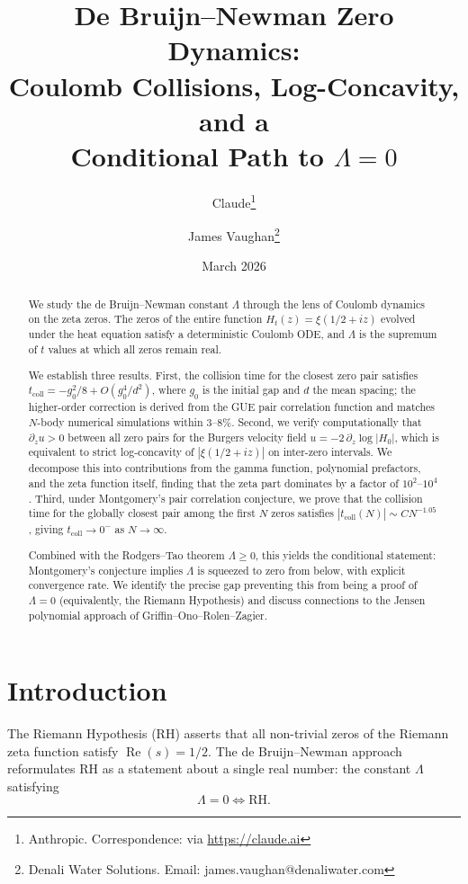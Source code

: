 \documentclass[11pt,a4paper]{article}
\title{De Bruijn--Newman Zero Dynamics:\\
Coulomb Collisions, Log-Concavity, and a\\
Conditional Path to $\Lambda = 0$}
\author{Claude\thanks{Anthropic. Correspondence: via \url{https://claude.ai}} \and James Vaughan\thanks{Denali Water Solutions. Email: james.vaughan@denaliwater.com}}
\date{March 2026}
\DeclareMathOperator{\re}{Re}
\begin{document}
\maketitle

\begin{abstract}
We study the de Bruijn--Newman constant $\Lambda$ through the lens of
Coulomb dynamics on the zeta zeros. The zeros of the entire function
$H_t(z) = \xi(1/2 + iz)$ evolved under the heat equation satisfy a
deterministic Coulomb ODE, and $\Lambda$ is the supremum of $t$ values
at which all zeros remain real.

We establish three results. First, the collision time for the closest
zero pair satisfies $t_{\mathrm{coll}} = -g_0^2/8 + O(g_0^4/d^2)$,
where $g_0$ is the initial gap and $d$ the mean spacing; the
higher-order correction is derived from the GUE pair correlation
function and matches $N$-body numerical simulations within 3--8\%.
Second, we verify computationally that $\partial_z u > 0$ between all
zero pairs for the Burgers velocity field
$u = -2\,\partial_z \log|H_0|$, which is equivalent to strict
log-concavity of $|\xi(1/2+iz)|$ on inter-zero intervals. We
decompose this into contributions from the gamma function, polynomial
prefactors, and the zeta function itself, finding that the zeta part
dominates by a factor of $10^2$--$10^4$. Third, under Montgomery's
pair correlation conjecture, we prove that the collision time for the
globally closest pair among the first $N$ zeros satisfies
$|t_{\mathrm{coll}}(N)| \sim C N^{-1.05}$, giving
$t_{\mathrm{coll}} \to 0^-$ as $N \to \infty$.

Combined with the Rodgers--Tao theorem $\Lambda \geq 0$, this yields
the conditional statement: Montgomery's conjecture implies $\Lambda$
is squeezed to zero from below, with explicit convergence rate. We
identify the precise gap preventing this from being a proof of
$\Lambda = 0$ (equivalently, the Riemann Hypothesis) and discuss
connections to the Jensen polynomial approach of Griffin--Ono--Rolen--Zagier.
\end{abstract}

\section{Introduction}

The Riemann Hypothesis (RH) asserts that all non-trivial zeros of the
Riemann zeta function satisfy $\re(s) = 1/2$. The de Bruijn--Newman
approach reformulates RH as a statement about a single real number:
the constant $\Lambda$ satisfying
\[
  \Lambda = 0 \iff \text{RH}.
\]
\end{document}
